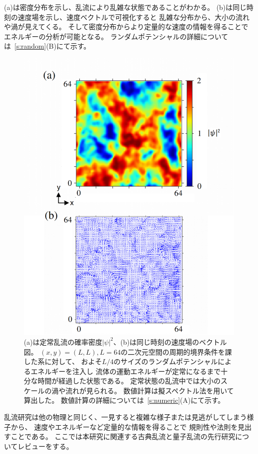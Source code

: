 \documentclass[12pt,a4paper]{jbook}
\begin{document}
        (a)は密度分布を示し、乱流により乱雑な状態であることがわかる。
        (b)は同じ時刻の速度場を示し、速度ベクトルで可視化すると
        乱雑な分布から、大小の流れや渦が見えてくる。
        そして密度分布からより定量的な速度の情報を得ることでエネルギーの分析が可能となる。
        ランダムポテンシャルの詳細については~\ref{s:random}(B)にて示す。
		\begin{figure}[H]
			\centering
			\includegraphics[width=14cm]{vorticity.eps}
			\caption{
                (a)は定常乱流の確率密度$|\psi|^2$、(b)は同じ時刻の速度場のベクトル図。
                $(x,y)=(L,L), L=64$の二次元空間の周期的境界条件を課した系に対して、
                およそ$L/4$のサイズのランダムポテンシャルによるエネルギーを注入し
                流体の運動エネルギーが定常になるまで十分な時間が経過した状態である。
                定常状態の乱流中では大小のスケールの渦や流れが見られる。
                数値計算は擬スペクトル法を用いて算出した。
                数値計算の詳細については~\ref{s:numeric}(A)にて示す。
			}
			\label{FIG:vorticity}
		\end{figure}
        乱流研究は他の物理と同じく、一見すると複雑な様子または見逃がしてしまう様子から、
        速度やエネルギーなど定量的な情報を得ることで
        規則性や法則を見出すことである。
		ここでは本研究に関連する古典乱流と量子乱流の先行研究についてレビューをする。
\end{document}
